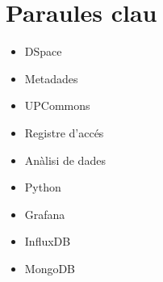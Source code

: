 \clearpage
\section*{Paraules clau}\label{sec:keywords-ca}
\begin{multicols}{3}
    \begin{itemize}
        \item DSpace
        \item Metadades
        \item UPCommons
    \end{itemize}
    \columnbreak
    \begin{itemize}
        \item Registre d’accés
        \item Anàlisi de dades
        \item Python
    \end{itemize}
    \columnbreak
    \begin{itemize}
        \item Grafana
        \item InfluxDB
        \item MongoDB
    \end{itemize}
\end{multicols}